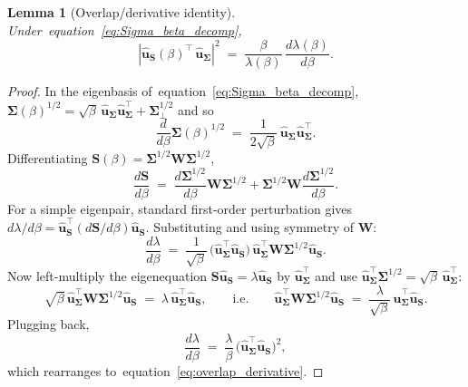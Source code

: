 \documentclass[10pt,a4paper]{amsart}
\newtheorem{lemma}{Lemma}
\def\eqref#1{equation~\ref{#1}}
\def\mS{{\bm{S}}}
\def\mSigma{{\bm{\Sigma}}}
\def\mW{{\bm{W}}}
\def\vu{{\bm{u}}}
\begin{document}
\begin{lemma}[Overlap/derivative identity]\label{lem:overlap_derivative}
    Under~\eqref{eq:Sigma_beta_decomp},
    \begin{equation}\label{eq:overlap_derivative}
        |\hat\vu_\mS(\beta)^\top\,\hat\vu_\mSigma|^2
        \;=\; \frac{\beta}{\lambda(\beta)}\,\frac{d\lambda(\beta)}{d\beta}.
    \end{equation}
\end{lemma}

\begin{proof}
In the eigenbasis of~\eqref{eq:Sigma_beta_decomp}, $\mSigma(\beta)^{1/2}=\sqrt\beta\,\hat\vu_\mSigma\hat\vu_\mSigma^\top + \mSigma_\perp^{1/2}$ and so
\[
    \frac{d}{d\beta}\mSigma(\beta)^{1/2} \;=\; \frac{1}{2\sqrt\beta}\,\hat\vu_\mSigma\hat\vu_\mSigma^\top.
\]
Differentiating $\mS(\beta)=\mSigma^{1/2}\mW\mSigma^{1/2}$,
\[
    \frac{d\mS}{d\beta} \;=\; \frac{d\mSigma^{1/2}}{d\beta}\mW\mSigma^{1/2} + \mSigma^{1/2}\mW\frac{d\mSigma^{1/2}}{d\beta}.
\]
For a simple eigenpair, standard first-order perturbation gives $d\lambda/d\beta = \hat\vu_\mS^\top (d\mS/d\beta)\hat\vu_\mS$. Substituting and using symmetry of $\mW$:
\[
    \frac{d\lambda}{d\beta} \;=\; \frac{1}{\sqrt\beta}\,\big(\hat\vu_\mSigma^\top\hat\vu_\mS\big)\,\hat\vu_\mSigma^\top\mW\mSigma^{1/2}\hat\vu_\mS.
\]
Now left-multiply the eigenequation $\mS\hat\vu_\mS=\lambda\hat\vu_\mS$ by $\hat\vu_\mSigma^\top$ and use $\hat\vu_\mSigma^\top\mSigma^{1/2}=\sqrt\beta\,\hat\vu_\mSigma^\top$:
\[
    \sqrt\beta\,\hat\vu_\mSigma^\top\mW\mSigma^{1/2}\hat\vu_\mS \;=\; \lambda\,\hat\vu_\mSigma^\top\hat\vu_\mS,
    \qquad\text{i.e.}\qquad
    \hat\vu_\mSigma^\top\mW\mSigma^{1/2}\hat\vu_\mS \;=\; \frac{\lambda}{\sqrt\beta}\,\hat\vu_\mSigma^\top\hat\vu_\mS.
\]
Plugging back,
\[
    \frac{d\lambda}{d\beta} \;=\; \frac{\lambda}{\beta}\,\big(\hat\vu_\mSigma^\top\hat\vu_\mS\big)^2,
\]
which rearranges to~\eqref{eq:overlap_derivative}.
\end{proof}
\end{document}
